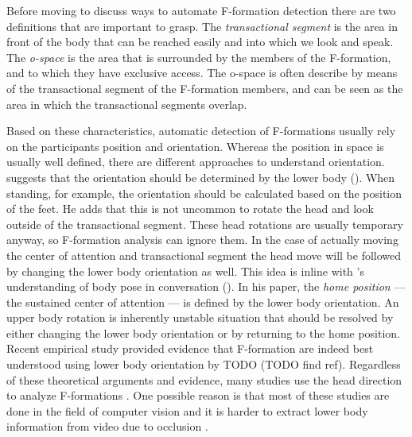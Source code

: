\documentclass[]{simple-thesis}
\begin{document}
Before moving to discuss ways to automate F-formation detection there are two definitions that are important to grasp.
The \textit{transactional segment} is the area in front of the body that can be reached easily and into which we look and speak.
The \textit{o-space} is the area that is surrounded by the members of the F-formation, and to which they have exclusive access.
The o-space is often describe by means of the transactional segment of the F-formation members, and can be seen as the area in which the transactional segments overlap.

Based on these characteristics, automatic detection of F-formations usually rely on the participants position and orientation.
Whereas the position in space is usually well defined, there are different approaches to understand orientation.
\citeauthor{Kendon1990} suggests that the orientation should be determined by the lower body (\citeyear{Kendon1990}).
When standing, for example, the orientation should be calculated based on the position of the feet.
He adds that this is not uncommon to rotate the head and look outside of the transactional segment.
These head rotations are usually temporary anyway, so F-formation analysis can ignore them.
In the case of actually moving the center of attention and transactional segment the head move will be followed by changing the lower body orientation as well.
This idea is inline with \citeauthor{Schegloff1998}'s understanding of body pose in conversation (\citeyear{Schegloff1998}).
In his paper, the \textit{home position} --- the sustained center of attention --- is defined by the lower body orientation.
An upper body rotation is inherently unstable situation that should be resolved by either changing the lower body orientation or by returning to the home position.
Recent empirical study provided evidence that F-formation are indeed best understood using lower body orientation by TODO (TODO find ref).
Regardless of these theoretical arguments and evidence, many studies use the head direction to analyze F-formations \citep{Cristani2011, Setti2013, Vascon2014}.
One possible reason is that most of these studies are done in the field of computer vision and it is harder to extract lower body information from video due to occlusion \citep{Yasuda2014, Vascon2014}.
\end{document}
